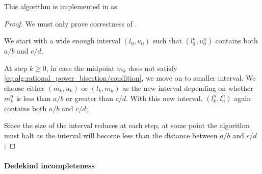 \begin{comments}
  \item This algorithm is implemented in \cite{notebook:code} as
  \begin{CodeRefDisplay}
  \end{CodeRefDisplay}
\end{comments}
\begin{proof}
  We must only prove correctness of .

  We start with a wide enough interval \( (l_0, u_0) \) such that \( (l_0^n, u_0^n) \) contains both \( a / b \) and \( c / d \).

  At step \( k \geq 0 \), in case the midpoint \( m_k \) does not satisfy \eqref{eq:alg:rational_power_bisection/condition}, we move on to smaller interval. We choose either \( (m_k, u_k) \) or \( (l_k, m_k) \) as the new interval depending on whether \( m_k^n \) is less than \( a / b \) or greater than \( c / d \). With this new interval, \( (l_k^n, l_n^n) \) again contains both \( a / b \) and \( c / d \);

  Since the size of the interval reduces at each step, at some point the algorithm must halt as the interval will become less than the distance between \( a / b \) and \( c / d \);
\end{proof}

\paragraph{Dedekind incompleteness}

